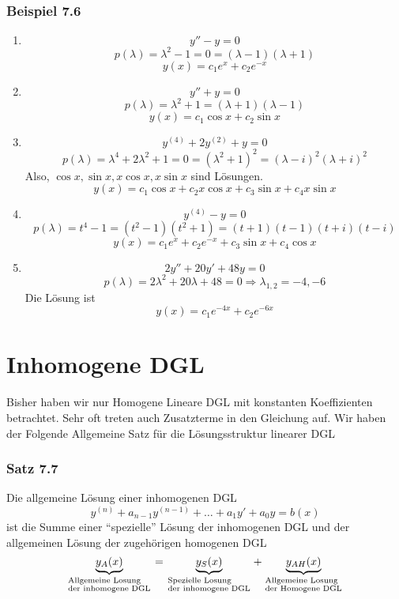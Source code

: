\subsubsection*{Beispiel 7.6}
\begin{enumerate}
\item $$y''-y=0$$
$$p(\lambda)=\lambda^2-1=0=(\lambda-1)(\lambda+1)$$
$$y(x)=c_1e^x+c_2e^{-x}$$
\item $$y''+y=0$$
$$p(\lambda)=\lambda^2+1=(\lambda+1)(\lambda-1)$$
$$y(x)=c_1\cos x+c_2\sin x$$
\item $$y^{(4)}+2y^{(2)}+y=0$$
$$p(\lambda)=\lambda^4+2\lambda^2+1=0=(\lambda^2+1)^2=(\lambda-i)^2(\lambda+i)^2$$
Also, $\cos x, \sin x, x\cos x,x\sin x$ sind Lösungen. $$y(x)=c_1\cos x+c_2 x\cos x+c_3\sin x+c_4 x\sin x$$
\item $$y^{(4)}-y=0$$
$$p(\lambda)=t^4-1=(t^2-1)(t^2+1)=(t+1)(t-1)(t+i)(t-i)$$
$$y(x)=c_1e^x+c_2e^{-x}+c_3\sin x+c_4\cos x$$
\item $$2y''+20y'+48y=0$$
$$p(\lambda)=2\lambda^2 +20\lambda+48=0\Rightarrow \lambda_{1,2}=-4,-6$$ 
Die Lösung ist $$y(x)=c_1e^{-4x}+c_2e^{-6x}$$
\end{enumerate}
\section{Inhomogene DGL}
Bisher haben wir nur Homogene Lineare DGL mit konstanten Koeffizienten betrachtet. Sehr oft treten auch Zusatzterme in den Gleichung auf. Wir haben der Folgende Allgemeine Satz für die Lösungsstruktur linearer DGL
\subsubsection*{Satz 7.7}
Die allgemeine Lösung einer inhomogenen DGL $$y^{(n)}+a_{n-1}y^{(n-1)}+\dots +a_1y'+a_0y=b(x)$$ ist die Summe einer ``spezielle'' Lösung der inhomogenen DGL und der allgemeinen Lösung der zugehörigen homogenen DGL $$\underbrace {{y_A}(x)}_{\scriptstyle{\text{Allgemeine Losung }}\hfill\atop
\scriptstyle{\text{der inhomogene DGL}}\hfill} = \underbrace {{y_S}(x)}_{\scriptstyle{\text{Spezielle Losung }}\hfill\atop
\scriptstyle{\text{der inhomogene DGL}}\hfill} + \underbrace {{y_{AH}}(x)}_{\scriptstyle{\text{Allgemeine Losung }}\hfill\atop
\scriptstyle{\text{der Homogene DGL}}\hfill}$$
